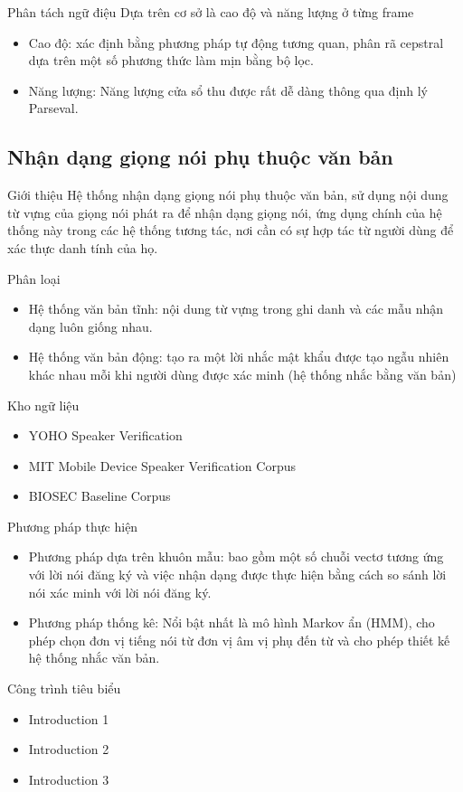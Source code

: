 \documentclass[notheorems, aspectratio=54]{beamer}
\begin{document}
\begin{frame}{Phân tách ngữ điệu}
	Dựa trên cơ sở là cao độ và năng lượng ở từng frame
	\begin{itemize}
		\item Cao độ: xác định bằng phương pháp tự động tương quan, phân rã cepstral dựa trên một số phương thức làm mịn bằng bộ lọc.
		\item Năng lượng: Năng lượng cửa sổ thu được rất dễ dàng thông qua định lý Parseval.
	\end{itemize}
\end{frame}

\subsection{Nhận dạng giọng nói phụ thuộc văn bản}
\begin{frame}{Giới thiệu}
	Hệ thống nhận dạng giọng nói phụ thuộc văn bản, sử dụng nội dung từ vựng của giọng nói phát
	ra để nhận dạng giọng nói, ứng dụng chính của hệ thống này trong các hệ thống tương tác, nơi cần có sự hợp tác từ người dùng để xác thực danh tính của họ.
	
	Phân loại
	\begin{itemize}
		\item Hệ thống văn bản tĩnh: nội dung từ vựng trong ghi danh và các mẫu nhận dạng luôn giống
		nhau.
		\item Hệ thống văn bản động: tạo ra một lời nhắc mật khẩu được tạo ngẫu nhiên khác nhau mỗi
		khi người dùng được xác minh (hệ thống nhắc bằng văn bản)
	\end{itemize}

	Kho ngữ liệu
	\begin{itemize}
		\item YOHO Speaker Verification
		\item MIT Mobile Device Speaker Verification Corpus
		\item BIOSEC Baseline Corpus
	\end{itemize}
\end{frame}
\begin{frame}{Phương pháp thực hiện}
	\begin{itemize}
		\item Phương pháp dựa trên khuôn mẫu: bao gồm một số chuỗi vectơ tương ứng với lời nói đăng
		ký và việc nhận dạng được thực hiện bằng cách so sánh lời nói xác minh với lời nói đăng ký.
		\item Phương pháp thống kê: Nổi bật nhất là mô hình Markov ẩn (HMM), cho phép chọn đơn vị tiếng nói từ đơn vị âm vị phụ đến từ và cho phép thiết kế hệ thống nhắc văn bản.
	\end{itemize}
\end{frame}
\begin{frame}{Công trình tiêu biểu}
	\begin{itemize}
		\item Introduction 1
		\item Introduction 2
		\item Introduction 3
	\end{itemize}
\end{frame}
\end{document}
